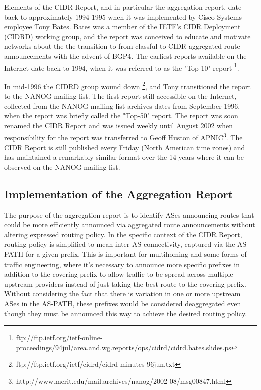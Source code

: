 Elements of the CIDR Report, and in particular the aggregation report, date back to approximately 1994-1995 when it was implemented by Cisco Systems employee Tony Bates. Bates was a member of the IETF's CIDR Deployment (CIDRD) working group, and the report was conceived to educate and motivate networks about the the transition to from classful to CIDR-aggregated route announcements with the advent of BGP4. The earliest reports available on the Internet date back to 1994, when it was referred to as the "Top 10" report \footnote{ftp://ftp.ietf.org/ietf-online-proceedings/94jul/area.and.wg.reports/ops/cidrd/cidrd.bates.slides.ps}.

In mid-1996 the CIDRD group wound down \footnote{ftp://ftp.ietf.org/ietf/cidrd/cidrd-minutes-96jun.txt}, and Tony transitioned the report to the NANOG mailing list. The first report still accessible on the Internet, collected from the NANOG mailing list archives \cite{NANOG} dates from September 1996, when the report was briefly called the "Top-50" report. The report was soon renamed the CIDR Report and was issued weekly until August 2002 when responsibility for the report was transferred to Geoff Huston of APNIC\footnote{http://www.merit.edu/mail.archives/nanog/2002-08/msg00847.html}. The CIDR Report is still published every Friday (North American time zones) and has maintained a remarkably similar format over the 14 years where it can be observed on the NANOG mailing list.

\subsection{Implementation of the Aggregation Report}

The purpose of the aggregation report is to identify ASes announcing routes that could be more efficiently announced via aggregated route announcements without altering expressed routing policy. In the specific context of the CIDR Report, routing policy is simplified to mean inter-AS connectivity, captured via the AS-PATH for a given prefix. This is important for multihoming and some forms of traffic engineering, where it's necessary to announce more specific prefixes in addition to the covering prefix to allow traffic to be spread across multiple upstream providers instead of just taking the best route to the covering prefix. Without considering the fact that there is variation in one or more upstream ASes in the AS-PATH, these prefixes would be considered deaggregated even though they must be announced this way to achieve the desired routing policy.

